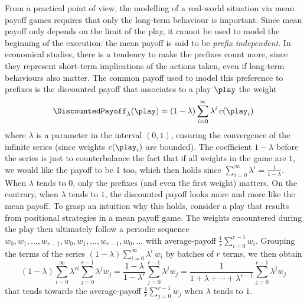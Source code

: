 From a practical point of view, the modelling of a real-world
situation via mean payoff games requires that only the long-term
behaviour is important. Since mean payoff only depends on the limit of
the play, it cannot be used to model the beginning of the execution:
the mean payoff is said to be \emph{prefix independent}. In economical
studies, there is a tendency to make the prefixes count more, since
they represent short-term implications of the actions taken, even if
long-term behaviours also matter. The common payoff used to model this
preference to prefixes is the discounted payoff that associates to a
play $\play$ the weight
\[\DiscountedPayoff_\lambda(\play) = (1-\lambda)\sum_{i=0}^{\infty} \lambda^i
  \, c(\play_i)\] where $\lambda$ is a parameter in the interval
$(0,1)$, ensuring the convergence of the infinite series (since
weights $c(\play_i)$ are bounded). The coefficient $1-\lambda$ before
the series is just to counterbalance the fact that if all weights in
the game are $1$, we would like the payoff to be 1 too, which then
holds since $\sum_{i=0}^\infty \lambda^i = \frac 1{1-\lambda}$. When
$\lambda$ tends to $0$, only the prefixes (and even the first weight)
matters. On the contrary, when $\lambda$ tends to $1$, the
discounted payoff looks more and more like the mean payoff. To grasp
an intuition why this holds, consider a play that results from
positional strategies in a mean payoff game. The weights encountered
during the play then ultimately follow a periodic sequence
$w_0,w_1,\ldots,w_{r-1},w_0,w_1,\ldots,w_{r-1},w_0,\ldots$ with
average-payoff $\frac 1 r\sum_{i=0}^{r-1}w_i$. Grouping the terms of
the series $(1-\lambda)\sum_{i=0}^{\infty} \lambda^i \, w_i$ by
batches of $r$ terms, we then obtain
\[(1-\lambda)\sum_{i=0}^{\infty} \lambda^{ri} \sum_{j=0}^{r-1}
  \lambda^jw_j=\frac{1-\lambda}{1-\lambda^r}\sum_{j=0}^{r-1}
  \lambda^jw_j= \frac
  1{1+\lambda+\cdots+\lambda^{r-1}}\sum_{j=0}^{r-1} \lambda^jw_j\]
that tends towards the average-payoff $\frac 1 r\sum_{j=0}^{r-1} w_j$
when $\lambda$ tends to $1$.

